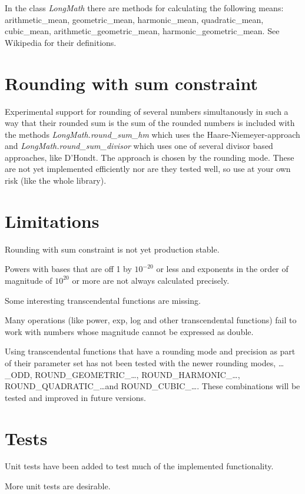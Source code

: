 \documentclass[10pt,a4paper]{article}
\begin{document}
In the class {\slshape LongMath} there are methods for calculating the
following means: arithmetic\_mean, geometric\_mean, harmonic\_mean,
quadratic\_mean, cubic\_mean, arithmetic\_geometric\_mean,
harmonic\_geometric\_mean.  See Wikipedia for their definitions.

\section{Rounding with sum constraint}

Experimental support for rounding of several numbers simultanously in
such a way that their rounded sum is the sum of the rounded numbers is
included with the methods {\slshape LongMath.round\_sum\_hm} which uses
the Haare-Niemeyer-approach and {\slshape LongMath.round\_sum\_divisor}
which uses one of several divisor based approaches, like D'Hondt. The
approach is chosen by the rounding mode. These are not yet implemented
efficiently nor are they tested well, so use at your own risk (like
the whole library).

\section{Limitations}

Rounding with sum constraint is not yet production stable.

Powers with bases that are off 1 by $10^{-20}$ or less and exponents
in the order of magnitude of $10^20$ or more are not always calculated
precisely.

Some interesting transcendental functions are missing.

Many operations (like power, exp, log and other transcendental functions) fail to work with numbers whose magnitude cannot be
expressed as double.

Using transcendental functions that have a rounding mode and precision
as part of their parameter set has not been tested with the newer
rounding modes, \dots\_ODD, ROUND\_GEOMETRIC\_\dots,
ROUND\_HARMONIC\_\dots, ROUND\_QUADRATIC\_\dots and
ROUND\_CUBIC\_\dots.
These combinations will be tested and improved in future versions.

\section{Tests}

Unit tests have been added to test much of the implemented
functionality.

More unit tests are desirable.
\end{document}
